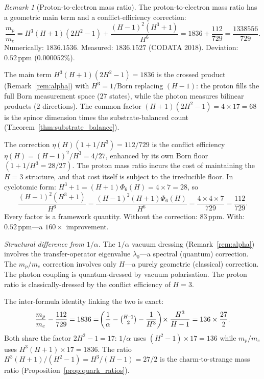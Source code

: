 \documentclass[11pt,a4paper]{article}
\theoremstyle{definition}
\theoremstyle{remark}
\newtheorem{remark}[theorem]{Remark}
\begin{document}
\begin{remark}[Proton-to-electron mass ratio]\label{rem:proton_electron}
The proton-to-electron mass ratio has a geometric main term and a conflict-efficiency correction:
\begin{equation}\label{eq:proton_electron}
\frac{m_p}{m_e} = H^3(H+1)(2H^2-1)+\frac{(H-1)^2(H^3+1)}{H^6} = 1836+\frac{112}{729} = \frac{1338556}{729}.
\end{equation}
Numerically: $1836.1536$. Measured: $1836.1527$ (CODATA 2018). Deviation: $0.52\,\mathrm{ppm}$ ($0.000052\%$).

The main term $H^3(H+1)(2H^2\!-\!1)=1836$ is the crossed product (Remark~\ref{rem:alpha}) with $H^3=1/\mathrm{Born}$ replacing $(H\!-\!1)$: the proton fills the full Born measurement space ($27$ states), while the photon measures bilinear products ($2$ directions). The common factor $(H\!+\!1)(2H^2\!-\!1)=4\times 17=68$ is the spinor dimension times the substrate-balanced count (Theorem~\ref{thm:substrate_balance}).

The correction $\eta(H)(1+1/H^3)=112/729$ is the conflict efficiency $\eta(H)=(H\!-\!1)^2/H^3=4/27$, enhanced by its own Born floor $(1+1/H^3=28/27)$. The proton mass ratio incurs the cost of maintaining the $H=3$ structure, and that cost itself is subject to the irreducible floor. In cyclotomic form: $H^3+1=(H+1)\Phi_6(H)=4\times 7=28$, so
\begin{equation}\label{eq:mp_correction}
\frac{(H-1)^2(H^3+1)}{H^6} = \frac{(H-1)^2(H+1)\Phi_6(H)}{H^6} = \frac{4\times 4\times 7}{729} = \frac{112}{729}.
\end{equation}
Every factor is a framework quantity. Without the correction: $83\,\mathrm{ppm}$. With: $0.52\,\mathrm{ppm}$---a $160\times$ improvement.

\emph{Structural difference from $1/\alpha$.} The $1/\alpha$ vacuum dressing (Remark~\ref{rem:alpha}) involves the transfer-operator eigenvalue $\lambda_0$---a spectral (quantum) correction. The $m_p/m_e$ correction involves only $H$---a purely geometric (classical) correction. The photon coupling is quantum-dressed by vacuum polarisation. The proton ratio is classically-dressed by the conflict efficiency of $H=3$.

The inter-formula identity linking the two is exact:
\begin{equation}\label{eq:mp_alpha_bridge}
\frac{m_p}{m_e}-\frac{112}{729} = 1836 = \!\left(\frac{1}{\alpha}-\tbinom{H\!-\!1}{2}-\frac{1}{H^3}\right)\!\times\frac{H^3}{H-1} = 136\times\frac{27}{2}.
\end{equation}
Both share the factor $2H^2\!-\!1=17$: $1/\alpha$ uses $(H^2\!-\!1)\times 17=136$ while $m_p/m_e$ uses $H^3(H\!+\!1)\times 17=1836$. The ratio $H^3(H\!+\!1)/(H^2\!-\!1)=H^3/(H\!-\!1)=27/2$ is the charm-to-strange mass ratio (Proposition~\ref{prop:quark_ratios}).
\end{remark}
\end{document}
